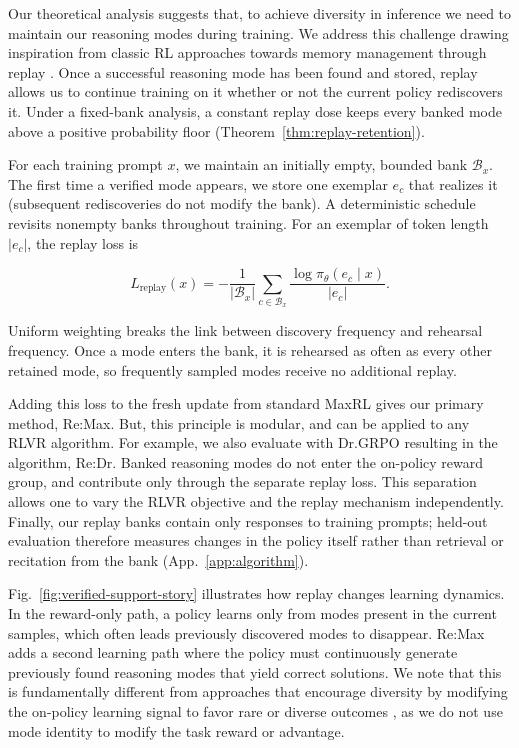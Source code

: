 \documentclass{article}
\newcommand{\1}{\mathbf 1}
\theoremstyle{remark}
\theoremstyle{definition}
\theoremstyle{plain}
\begin{document}
Our theoretical analysis suggests that, to achieve diversity in inference we need to maintain our reasoning modes during training.
We address this challenge drawing inspiration from classic RL approaches towards memory management through replay \citep{lin1992selfimproving, DBLP:journals/corr/MnihKSGAWR13, rolnick2019replay}. Once a successful reasoning mode has been found and stored, replay allows us to continue training on it whether or not the current policy rediscovers it.
Under a fixed-bank analysis, a constant replay dose keeps every banked mode above a positive probability floor (Theorem~\ref{thm:replay-retention}).

For each training prompt $x$, we maintain an initially empty, bounded bank
$\mathcal B_x$.
The first time a verified mode appears, we store one exemplar $e_c$ that realizes it (subsequent rediscoveries do not modify the bank).
A deterministic schedule revisits nonempty banks throughout training.
For an exemplar of token length $|e_c|$, the replay loss is

\begin{equation}
 L_{\mathrm{replay}}(x)=-\frac{1}{|\mathcal B_x|}
 \sum_{c\in\mathcal B_x}\frac{\log\pi_\theta(e_c\mid x)}{|e_c|}.
 \label{eq:lm-verified-replay}
\end{equation}

Uniform weighting breaks the link between discovery frequency and rehearsal frequency.
Once a mode enters the bank, it is rehearsed as often as every other retained mode, so frequently sampled modes receive no additional replay.

Adding this loss to the fresh update from standard MaxRL \citep{tajwar2026maxrl} gives our primary method, Re:Max. But, this principle is modular, and can be applied to any RLVR algorithm. For example, we also evaluate with Dr.GRPO \citep{liu2025understanding} resulting in the algorithm, Re:Dr. Banked reasoning modes do not enter the on-policy reward group, and contribute only through the separate replay loss.
This separation allows one to vary the RLVR objective and the replay mechanism independently. Finally, our replay banks contain only responses to training prompts; held-out evaluation therefore measures changes in the policy itself rather than retrieval or recitation from the bank (App.~\ref{app:algorithm}).

Fig.~\ref{fig:verified-support-story} illustrates how replay changes learning dynamics.
In the reward-only path, a policy learns only from modes present in the current samples, which often leads previously discovered modes to disappear. Re:Max adds a second learning path where the policy must continuously generate previously found reasoning modes that yield correct solutions.
We note that this is fundamentally different from approaches that encourage diversity by modifying the on-policy learning signal to favor rare or diverse outcomes
\citep{song2025outcome,li2026setpo}, as we do not use mode identity to modify the task reward or advantage.
\end{document}
